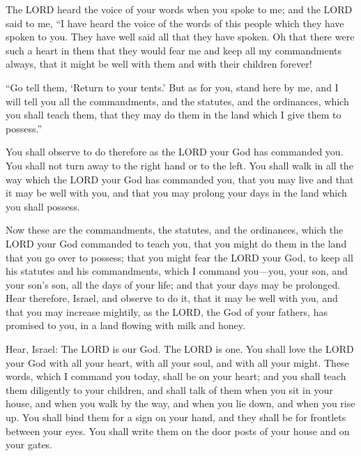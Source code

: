 	
	\myverse{}The LORD heard the voice of your words when you spoke to me;
	and the LORD said to me, “I have heard the voice of the words of this people which they have spoken to
	you. They have well said all that they have spoken.
	\myverse{}Oh that there were such a heart in them that they would fear me and keep all
	my commandments always, that it might be well with them and with their children forever!
	
	
	\myverse{}“Go tell them, ‘Return to your tents.’
	\myverse{}But as for you, stand here by me, and I will tell you all the commandments,
	and the statutes, and the ordinances, which you shall teach them, that they may do them in the land which
	I give them to possess.”
	
	
	\myverse{}You shall observe to do therefore as the LORD your God has commanded
	you. You shall not turn away to the right hand or to the left.
	\myverse{}You shall walk in all the way which the LORD your God has commanded you, that
	you may live and that it may be well with you, and that you may prolong your days in the land which you
	shall possess.
	
	
	\mychapter{} \myverse*{}Now these are the commandments, the statutes, and the ordinances,
	which the LORD your God commanded to teach you, that you might do them in the land that you go over to
	possess;
	\myverse{}that you might fear the LORD your God, to keep all his statutes and his commandments,
	which I command you—you, your son, and your son’s son, all the days of your life; and that your days may
	be prolonged.
	\myverse{}Hear therefore, Israel, and observe to do it, that it may be well with you,
	and that you may increase mightily, as the LORD, the God of your fathers, has promised to you, in a land
	flowing with milk and honey.
	
	
	\myverse{}Hear, Israel: The LORD is our God. The LORD is one.
	\myverse{}You shall love the LORD your God with all your heart, with all your soul, and
	with all your might.
	\myverse{}These words, which I command you today, shall be on your heart;
	\myverse{}and you shall teach them diligently to your children, and shall talk of them
	when you sit in your house, and when you walk by the way, and when you lie down, and when you rise up.
	\myverse{}You shall bind them for a sign on your hand, and they shall be for frontlets
	between your eyes.
	\myverse{}You shall write them on the door posts of your house and on your gates.
	
